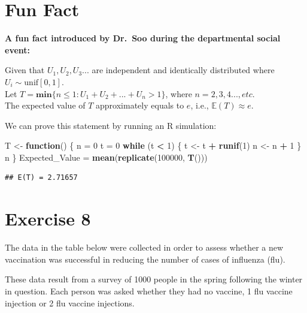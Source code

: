 \documentclass[
]{book}
\newenvironment{Shaded}{\begin{snugshade}}{\end{snugshade}}
\newcommand{\ControlFlowTok}[1]{\textcolor[rgb]{0.13,0.29,0.53}{\textbf{#1}}}
\newcommand{\DecValTok}[1]{\textcolor[rgb]{0.00,0.00,0.81}{#1}}
\newcommand{\FunctionTok}[1]{\textcolor[rgb]{0.13,0.29,0.53}{\textbf{#1}}}
\newcommand{\NormalTok}[1]{#1}
\newcommand{\OtherTok}[1]{\textcolor[rgb]{0.56,0.35,0.01}{#1}}
\newcommand{\SpecialCharTok}[1]{\textcolor[rgb]{0.81,0.36,0.00}{\textbf{#1}}}
\begin{document}
\chapter{Fun Fact}\label{fun-fact}

\textbf{A fun fact introduced by Dr.~Soo during the departmental social event:}

Given that \(U_1, U_2, U_3...\) are independent and identically distributed where \(U_i \sim \text{unif}[0,1]\).\\
Let \(T = \textbf{min}\{n \leq 1: U_1 + U_2 + ... + U_n > 1\}\), where \(n = 2, 3, 4..., etc\).\\
The expected value of \(T\) approximately equals to \(e\), i.e., \(\mathbb{E}(T) \approx e\).

We can prove this statement by running an R simulation:

\begin{Shaded}
\begin{Highlighting}[]
\NormalTok{T }\OtherTok{\textless{}{-}} \ControlFlowTok{function}\NormalTok{() \{}
\NormalTok{  n }\OtherTok{=} \DecValTok{0}
\NormalTok{  t }\OtherTok{=} \DecValTok{0}
  \ControlFlowTok{while}\NormalTok{ (t }\SpecialCharTok{\textless{}} \DecValTok{1}\NormalTok{) \{}
\NormalTok{    t }\OtherTok{\textless{}{-}}\NormalTok{ t }\SpecialCharTok{+} \FunctionTok{runif}\NormalTok{(}\DecValTok{1}\NormalTok{)}
\NormalTok{    n }\OtherTok{\textless{}{-}}\NormalTok{ n }\SpecialCharTok{+} \DecValTok{1}
\NormalTok{  \}}
\NormalTok{  n}
\NormalTok{\}}
\NormalTok{Expected\_Value }\OtherTok{=} \FunctionTok{mean}\NormalTok{(}\FunctionTok{replicate}\NormalTok{(}\DecValTok{100000}\NormalTok{, }\FunctionTok{T}\NormalTok{()))}
\end{Highlighting}
\end{Shaded}

\begin{verbatim}
## E(T) = 2.71657
\end{verbatim}

\chapter{Exercise 8}\label{exercise-8}

The data in the table below were collected in order to assess whether a new vaccination was
successful in reducing the number of cases of influenza (flu).

These data result from a survey of 1000 people in the spring following the winter in question. Each
person was asked whether they had no vaccine, 1 flu vaccine injection or 2 flu vaccine injections.
\end{document}
